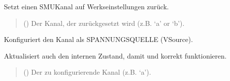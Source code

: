 \documentclass[letterpaper,10pt,english]{sphinxmanual}
\begin{document}
\begin{fulllineitems}
\begin{fulllineitems}
\label{\detokenize{modulab/smu_manager:modules.smu.SmuManager.SmuManager.reset_channel}}
\pysigstartsignatures
\pysiglinewithargsret
{}
{}
{}
\pysigstopsignatures
\sphinxAtStartPar
Setzt einen SMU\sphinxhyphen{}Kanal auf Werkseinstellungen zurück.
\begin{quote}\begin{description}
\sphinxAtStartPar
{} () \textendash{} Der Kanal, der zurückgesetzt wird (z.B. ‘a’ or ‘b’).

\end{description}\end{quote}

\end{fulllineitems}


\begin{fulllineitems}
\label{\detokenize{modulab/smu_manager:modules.smu.SmuManager.SmuManager.set_source_voltage}}
\pysigstartsignatures
\pysiglinewithargsret
{}
{}
{}
\pysigstopsignatures
\sphinxAtStartPar
Konfiguriert den Kanal als SPANNUNGSQUELLE (V\sphinxhyphen{}Source).

\sphinxAtStartPar
Aktualisiert auch den internen Zustand, damit 
und  korrekt funktionieren.
\begin{quote}\begin{description}
\sphinxAtStartPar
{} () \textendash{} Der zu konfigurierende Kanal (z.B. ‘a’).

\end{description}\end{quote}

\end{fulllineitems}



\end{fulllineitems}
\end{document}
